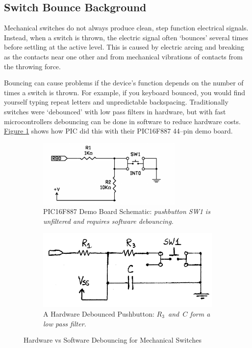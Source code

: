 \documentclass[11pt]{article}
\begin{document}
\subsection{Switch Bounce Background}

Mechanical switches do not always produce clean, step function electrical signals.
Instead, when a switch is thrown, the electric signal often `bounces' several times
before settling at the active level. This is caused by electric arcing and breaking
as the contacts near one other and from mechanical vibrations of contacts from the
throwing force.

Bouncing can cause problems if the device's function depends on the number of times
a switch is thrown. For example, if you keyboard bounced, you would find yourself
typing repeat letters and unpredictable backspacing. Traditionally switches were
`debounced' with low pass filters in hardware, but with fast microcontrollers
debouncing can be done in software to reduce hardware costs.
\hyperref[io-circuit-diagram]{Figure \ref{io-circuit-diagram}} shows how PIC did this
with their PIC16F887 44--pin demo board.

\begin{figure}
\centering
	\begin{subfigure}[b]{.4\textwidth}
		\centering
		\includegraphics[width=\textwidth]{Figures/demo-board-pushbutton-circuit.pdf}
		\caption[]%
		{{PIC16F887 Demo Board Schematic: \emph{pushbutton SW1 is unfiltered and requires software debouncing.}}}
	\end{subfigure}
	\quad
	\begin{subfigure}[b]{0.5\textwidth}
		\centering
		\includegraphics[width=\textwidth]{Figures/filtered-pushbutton-circuit.pdf}
		\caption[]%
		{{\small A Hardware Debounced Pushbutton: \emph{\mbox{$R_{3}$ and $C$} form a low pass filter.}}}
	\end{subfigure}	
	\caption{Hardware vs Software Debouncing for Mechanical Switches}
	\label{io-circuit-diagram}
\end{figure}
\end{document}
